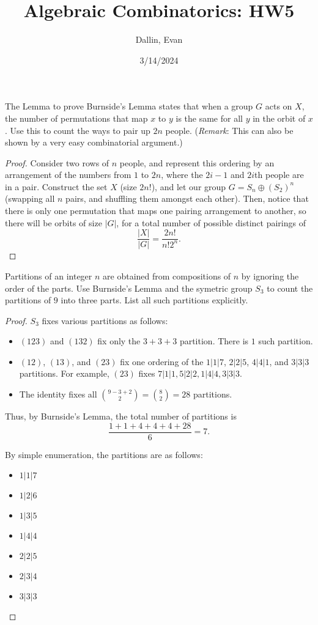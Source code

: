 \documentclass[11pt]{article}
\title{Algebraic Combinatorics: HW5}
\author{Dallin, Evan}
\date{3/14/2024}
\begin{document}
\maketitle
\begin{quest}[\textcolor{red}{Pairing $2n$ people}]
    The Lemma to prove Burnside’s Lemma states that when a group $G$ acts on $X$, the number of permutations that map $x$ to $y$ is the same for all $y$ in the orbit of $x$. Use this to count the ways to pair up $2n$ people. (\textit{Remark}: This can also be shown by a very easy combinatorial argument.)
\end{quest}
\begin{proof}
    Consider two rows of $n$ people, and represent this ordering by an arrangement of the numbers from $1$ to $2n$, where the $2i-1$ and $2i$th people are in a pair. Construct the set $X$ (size $2n!$), and let our group $G=S_n\oplus (S_2)^n$ (swapping all $n$ pairs, and shuffling them amongst each other). Then, notice that there is only one permutation that maps one pairing arrangement to another, so there will be orbits of size $|G|$, for a total number of possible distinct pairings of \[\frac{|X|}{|G|}=\frac{2n!}{n!2^n}.\]
\end{proof}
\begin{quest}
    Partitions of an integer $n$ are obtained from compositions of $n$ by ignoring the order of the parts. Use Burnside's Lemma and the symetric group $S_3$ to count the partitions of $9$ into three parts. List all such partitions explicitly.
\end{quest}
\begin{proof}
    $S_3$ fixes various partitions as follows:
    \begin{itemize}
        \item $(123)$ and $(132)$ fix only the $3+3+3$ partition. There is $1$ such partition.
        \item $(12)$, $(13)$, and $(23)$ fix one ordering of the $1|1|7$, $2|2|5$, $4|4|1$, and $3|3|3$ partitions. For example, $(23)$ fixes $7|1|1,5|2|2,1|4|4,3|3|3$.
        \item The identity fixes all $\binom{9-3+2}{2}=\binom{8}{2}=28$ partitions.
    \end{itemize}
    Thus, by Burnside's Lemma, the total number of partitions is
    \[\frac{1+1+4+4+4+28}{6}=\boxed{7}.\]

    By simple enumeration, the partitions are as follows:
    \begin{itemize}
        \item $1|1|7$
        \item $1|2|6$
        \item $1|3|5$
        \item $1|4|4$
        \item $2|2|5$
        \item $2|3|4$
        \item $3|3|3$
    \end{itemize}
\end{proof}
\end{document}
